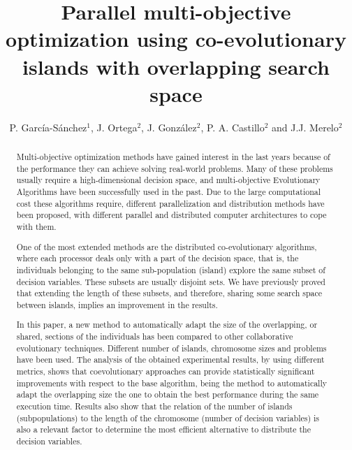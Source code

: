 \documentclass[preprint]{elsarticle}
\begin{document}
\begin{frontmatter}


\title{Parallel multi-objective optimization using co-evolutionary
  islands with overlapping search space}


\author{P. Garc\'ia-S\'anchez$^1$, J. Ortega$^2$, J. Gonz\'alez$^2$, P. A. Castillo$^2$ and J.J. Merelo$^2$}
\address{
$^1$ Department of Computer Science and Engineering. ESI. University of C\'adiz, Spain\\
$^2$ Department of Computer Architecture and Computer Technology.\\ ETSIIT - CITIC. University of Granada, Spain\\
}


\begin{abstract}
Multi-objective optimization methods have gained interest in the last
years because of the performance they can achieve solving real-world
problems. Many of these problems usually require a high-dimensional
decision space, and multi-objective Evolutionary Algorithms have been
successfully used in the past. Due to the large computational cost
these algorithms require, different parallelization and distribution
methods have been proposed, with different parallel and distributed
computer architectures to cope with them. 

One of the most extended
methods are the distributed co-evolutionary algorithms, where each
processor deals only with a part of the decision space, that is, the
individuals belonging to the same sub-population (island) explore the
same subset of decision variables. These subsets are usually disjoint
sets. We have previously proved that extending the length of these
subsets, and therefore, sharing some search space between islands,
implies an improvement in the results. 

In this paper, a new method to
automatically adapt the size of the overlapping, or shared, sections
of the individuals has been compared to other collaborative
evolutionary techniques. Different number of islands, chromosome sizes
and problems have been used. The analysis of the obtained experimental
results, by using different metrics, shows that coevolutionary
approaches can provide statistically significant improvements with
respect to the base algorithm, being the method to automatically adapt
the overlapping size the one to obtain the best performance during the
same execution time. Results also show that the relation of the number
of islands (subpopulations) to the length of the chromosome (number of
decision variables) is also a relevant factor to determine the most
efficient alternative to distribute the decision variables. 
\end{abstract}



\end{frontmatter}
\end{document}
